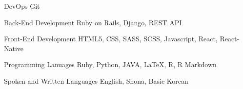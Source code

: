 


    {DevOps} %
    {Git} %

    {Back-End Development} %
    {Ruby on Rails, Django,  REST API} %

    {Front-End Development} %
    {HTML5, CSS, SASS, SCSS, Javascript, React, React-Native } %

    {Programming Lanuages} 
    {Ruby, Python, JAVA, LaTeX, R, R Markdown} %

    {Spoken and Written Languages}
    {English, Shona, Basic Korean} %



